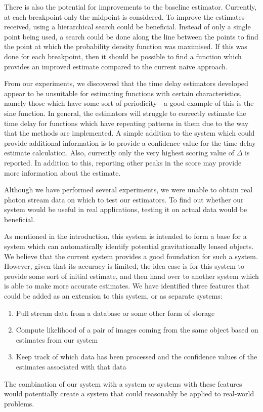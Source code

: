 \documentclass[a4paper,11pt]{article}
\begin{document}
There is also the potential for improvements to the baseline
estimator. Currently, at each breakpoint only the midpoint is considered. To
improve the estimates received, using a hierarchical search could be
beneficial. Instead of only a single point being used, a search could be done
along the line between the points to find the point at which the probability
density function was maximised. If this was done for each breakpoint, then it
should be possible to find a function which provides an improved estimate
compared to the current naive approach.

From our experiments, we discovered that the time delay estimators developed
appear to be unsuitable for estimating functions with certain characteristics,
namely those which have some sort of periodicity---a good example of this is the
sine function. In general, the estimators will struggle to correctly estimate
the time delay for functions which have repeating patterns in them due to the
way that the methods are implemented. A simple addition to the system which
could provide additional information is to provide a confidence value for the
time delay estimate calculation. Also, currently only the very highest scoring
value of $\Delta$ is reported. In addition to this, reporting other peaks in the
score may provide more information about the estimate.

Although we have performed several experiments, we were unable to obtain real
photon stream data on which to test our estimators. To find out whether our
system would be useful in real applications, testing it on actual data would be
beneficial.

As mentioned in the introduction, this system is intended to form a base for a
system which can automatically identify potential gravitationally lensed
objects. We believe that the current system provides a good foundation for such
a system. However, given that its accuracy is limited, the idea case is for this
system to provide some sort of initial estimate, and then hand over to another
system which is able to make more accurate estimates. We have identified three
features that could be added as an extension to this system, or as separate
systems:
\begin{enumerate}
\item Pull stream data from a database or some other form of storage
\item Compute likelihood of a pair of images coming from the same object based on
   estimates from our system
\item Keep track of which data has been processed and the confidence
   values of the estimates associated with that data
\end{enumerate}
The combination of our system with a system or systems with these features would
potentially create a system that could reasonably be applied to real-world problems.
\end{document}
